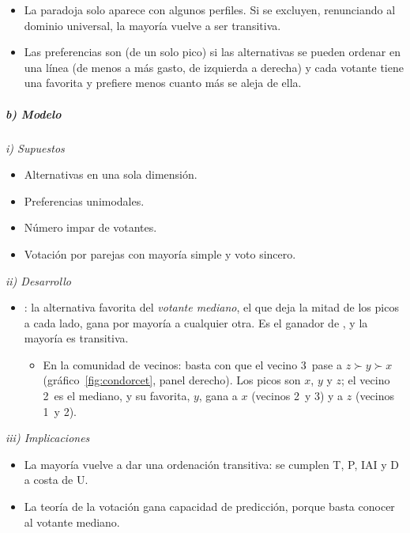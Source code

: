 \documentclass[11pt]{article}
\begin{document}
\begin{itemize}
\item La paradoja solo aparece con algunos perfiles. Si se excluyen, renunciando al dominio universal, la mayoría vuelve a ser transitiva.
\item Las preferencias son  (de un solo pico) si las alternativas se pueden ordenar en una línea (de menos a más gasto, de izquierda a derecha) y cada votante tiene una favorita y prefiere menos cuanto más se aleja de ella.
\end{itemize}

\subparagraph{b) Modelo}

\hspace*{3.6em}\emph{i) Supuestos}

\begin{itemize}
\item Alternativas en una sola dimensión.
\item Preferencias unimodales.
\item Número impar de votantes.
\item Votación por parejas con mayoría simple y voto sincero.
\end{itemize}

\hspace*{3.6em}\emph{ii) Desarrollo}

\begin{itemize}
\item {}\nocite{Black1948Rationale,Black1958Theory}: la alternativa favorita del \emph{votante mediano}, el que deja la mitad de los picos a cada lado, gana por mayoría a cualquier otra. Es el ganador de , y la mayoría es transitiva.
  \begin{itemize}
  \item En la comunidad de vecinos: basta con que el vecino 3~pase a $z\succ y\succ x$ (gráfico~\ref{fig:condorcet}, panel derecho). Los picos son $x$, $y$ y $z$; el vecino 2~es el mediano, y su favorita, $y$, gana a $x$ (vecinos 2~y 3) y a $z$ (vecinos 1~y 2).
  \end{itemize}
\end{itemize}

\hspace*{3.6em}\emph{iii) Implicaciones}

\begin{itemize}
\item La mayoría vuelve a dar una ordenación transitiva: se cumplen T, P, IAI y D a costa de U.
\item La teoría de la votación gana capacidad de predicción, porque basta conocer al votante mediano.
\end{itemize}
\end{document}
